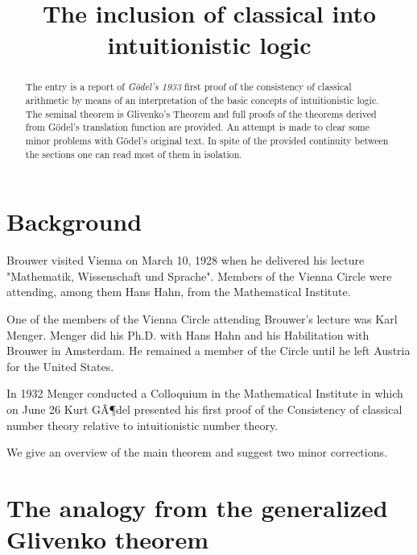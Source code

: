 \documentclass[12pt]{article}
\begin{document}
\title{The inclusion of classical into intuitionistic logic}\Large 
\maketitle

\begin{abstract}
The entry is a report of \emph{G\"{o}del's 1933} first proof of the consistency of classical arithmetic by means of an interpretation of the basic concepts of intuitionistic logic. The seminal theorem is Glivenko's Theorem and full proofs of the theorems derived from G\"{o}del's translation function are provided. An attempt is made to clear some minor problems with G\"{o}del's original text. In spite of the provided continuity between the sections one can read most of them in isolation.
\end{abstract}

\tableofcontents

\section{Background}\normalsize

Brouwer visited Vienna on March 10, 1928 when he delivered his lecture "Mathematik, Wissenschaft und Sprache". Members of the Vienna Circle were attending, among them Hans Hahn, from the Mathematical Institute.

One of the members of the Vienna Circle attending Brouwer's lecture was Karl Menger. Menger did his Ph.D. with Hans Hahn and his Habilitation with Brouwer in Amsterdam. He remained a member of the Circle until he left Austria for the United States.

In 1932 Menger conducted a Colloquium in the Mathematical Institute in which on June 26 Kurt GÃ¶del presented his first proof of the Consistency of classical number theory relative to intuitionistic number theory.

We give an overview of the main theorem and suggest two minor corrections. 

\section{The analogy from the generalized Glivenko theorem}\normalsize
\end{document}
